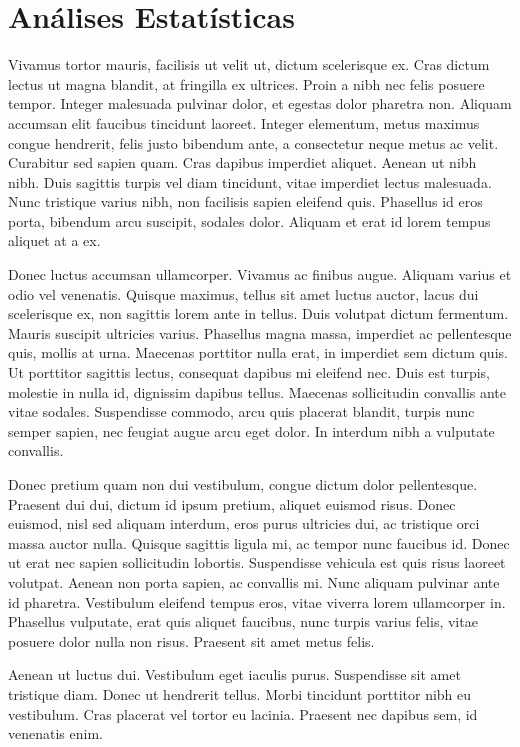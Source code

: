 \documentclass[book,A4paper,10pt,twoside,oldfontcommands]{memoir}\usepackage[]{graphicx}\usepackage[usenames,dvipsnames]{color}
\begin{document}
\section{Análises Estatísticas}


Vivamus tortor mauris, facilisis ut velit ut, dictum scelerisque ex.
Cras dictum lectus ut magna blandit, at fringilla ex ultrices. Proin a
nibh nec felis posuere tempor. Integer malesuada pulvinar dolor, et
egestas dolor pharetra non. Aliquam accumsan elit faucibus tincidunt
laoreet. Integer elementum, metus maximus congue hendrerit, felis
justo bibendum ante, a consectetur neque metus ac velit. Curabitur sed
sapien quam. Cras dapibus imperdiet aliquet. Aenean ut nibh nibh. Duis
sagittis turpis vel diam tincidunt, vitae imperdiet lectus malesuada.
Nunc tristique varius nibh, non facilisis sapien eleifend quis.
Phasellus id eros porta, bibendum arcu suscipit, sodales dolor.
Aliquam et erat id lorem tempus aliquet at a ex. 

Donec luctus accumsan ullamcorper. Vivamus ac finibus augue. Aliquam
varius et odio vel venenatis. Quisque maximus, tellus sit amet luctus
auctor, lacus dui scelerisque ex, non sagittis lorem ante in tellus.
Duis volutpat dictum fermentum. Mauris suscipit ultricies varius.
Phasellus magna massa, imperdiet ac pellentesque quis, mollis at urna.
Maecenas porttitor nulla erat, in imperdiet sem dictum quis. Ut
porttitor sagittis lectus, consequat dapibus mi eleifend nec. Duis est
turpis, molestie in nulla id, dignissim dapibus tellus. Maecenas
sollicitudin convallis ante vitae sodales. Suspendisse commodo, arcu
quis placerat blandit, turpis nunc semper sapien, nec feugiat augue
arcu eget dolor. In interdum nibh a vulputate convallis. 

Donec pretium quam non dui vestibulum, congue dictum dolor
pellentesque. Praesent dui dui, dictum id ipsum pretium, aliquet
euismod risus. Donec euismod, nisl sed aliquam interdum, eros purus
ultricies dui, ac tristique orci massa auctor nulla. Quisque sagittis
ligula mi, ac tempor nunc faucibus id. Donec ut erat nec sapien
sollicitudin lobortis. Suspendisse vehicula est quis risus laoreet
volutpat. Aenean non porta sapien, ac convallis mi. Nunc aliquam
pulvinar ante id pharetra. Vestibulum eleifend tempus eros, vitae
viverra lorem ullamcorper in. Phasellus vulputate, erat quis aliquet
faucibus, nunc turpis varius felis, vitae posuere dolor nulla non
risus. Praesent sit amet metus felis. 

Aenean ut luctus dui. Vestibulum eget iaculis purus. Suspendisse sit
amet tristique diam. Donec ut hendrerit tellus. Morbi tincidunt
porttitor nibh eu vestibulum. Cras placerat vel tortor eu lacinia.
Praesent nec dapibus sem, id venenatis enim. 
\end{document}
